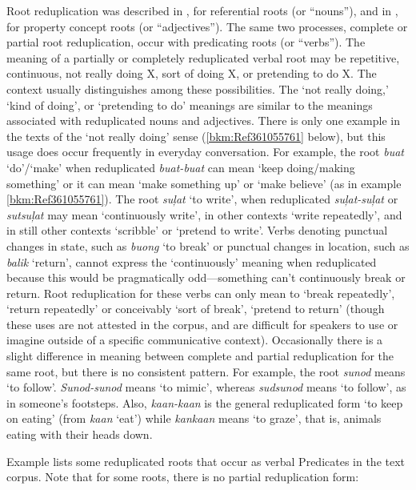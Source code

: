 Root reduplication was described in ,  for referential roots (or “nouns”), and in ,  for property concept roots (or “adjectives”). The same two processes, complete or partial root reduplication, occur with predicating roots (or “verbs”). The meaning of a partially or completely reduplicated verbal root may be repetitive, continuous, not really doing X, sort of doing X, or pretending to do X. The context usually distinguishes among these possibilities. The `not really doing,' `kind of doing', or `pretending to do' meanings are similar to the meanings associated with reduplicated nouns and adjectives. There is only one example in the texts of the `not really doing' sense (\ref{bkm:Ref361055761} below), but this usage does occur frequently in everyday conversation. For example, the root \textit{buat} ‘do’/‘make’ when reduplicated \textit{buat-buat} can mean ‘keep doing/making something’ or it can mean ‘make something up’ or ‘make believe’ (as in example \ref{bkm:Ref361055761}). The root \textit{suļat} ‘to write’, when reduplicated \textit{suļat-suļat} or \textit{sutsuļat} may mean ‘continuously write’, in other contexts ‘write repeatedly’, and in still other contexts ‘scribble’ or ‘pretend to write’. Verbs denoting punctual changes in state, such as \textit{buong} ‘to break’ or punctual changes in location, such as \textit{balik} ‘return’, cannot express the ‘continuously’ meaning when reduplicated because this would be pragmatically odd---something can’t continuously break or return. Root reduplication for these verbs can only mean to ‘break repeatedly’, ‘return repeatedly’ or conceivably ‘sort of break’, ‘pretend to return’ (though these uses are not attested in the corpus, and are difficult for speakers to use or imagine outside of a specific communicative context). Occasionally there is a slight difference in meaning between complete and partial reduplication for the same root, but there is no consistent pattern. For example, the root \textit{sunod} means ‘to follow’. \textit{Sunod-sunod} means `to mimic', whereas \textit{sudsunod} means `to follow', as in someone’s footsteps. Also, \textit{kaan-kaan} is the general reduplicated form ‘to keep on eating’ (from \textit{kaan} ‘eat’) while \textit{kankaan} means `to graze', that is, animals eating with their heads down.

Example  lists some reduplicated roots that occur as verbal Predicates in the text corpus. Note that for some roots, there is no partial reduplication form:

